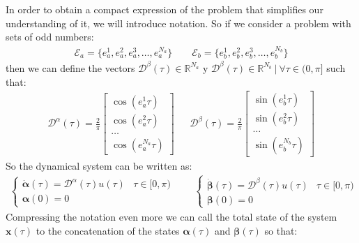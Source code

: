 In order to obtain a compact expression of the problem that simplifies our understanding of it, we will introduce notation.
%
So if we consider a problem with sets of odd numbers:
\begin{gather}
    \mathcal{E}_a = \{e_a^1,e_a^2,e_a^3,\dots,e_a^{N_a}\} \hspace{2em} \mathcal{E}_b = \{e_b^1,e_b^2,e_b^3,\dots,e_b^{N_b}\}    
\end{gather}
%
then we can define the vectors $\bm{\mathcal{D}}^\beta(\tau) \in \mathbb{R}^{N_a} $ y $ \bm{\mathcal{D}}^\beta(\tau) \in \mathbb{R}^{N_b} \ | \ \forall \tau \in (0,\pi]$ such that:
\begin{gather}
    \bm{\mathcal{D}}^\alpha(\tau) = 
    \frac{2}{\pi}
        \begin{bmatrix} 
        \cos(e_a^1\tau) \\
        \cos(e_a^2\tau) \\
        \dots           \\
        \cos(e_a^{N_a}\tau) 
    \end{bmatrix} \ \ \text{  }  \ \ 
    \bm{\mathcal{D}}^\beta(\tau) = 
    \frac{2}{\pi}
    \begin{bmatrix} 
    \sin(e_b^1\tau) \\
    \sin(e_b^2\tau) \\
    \dots           \\
    \sin(e_b^{N_b}\tau) 
    \end{bmatrix} 
\end{gather}
%
So the dynamical system can be written as:
\begin{gather}
    \begin{cases}
        \dot{\bm{\alpha}}(\tau) = \bm{\mathcal{D}}^\alpha(\tau) u(\tau) & \tau \in [0,\pi)\\
        \bm{\alpha}(0) = 0
    \end{cases} \hspace{2em}
    \begin{cases}
        \dot{\bm{\beta}}(\tau)  = \bm{\mathcal{D}}^\beta(\tau) u(\tau) & \tau \in [0,\pi) \\
        \bm{\beta}(0) = 0
    \end{cases}
\end{gather}
Compressing the notation even more we can call the total state of the system $ \bm {x} (\tau) $ to the concatenation of the states $ \bm {\alpha} (\tau) $ and $ \bm {\beta} ( \tau) $ so that:
